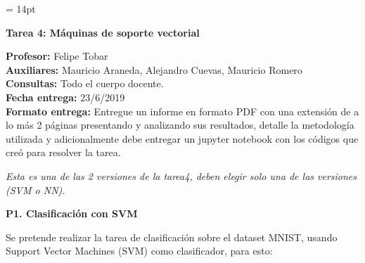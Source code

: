 \documentclass[11pt,letterpaper]{article}
\begin{document}
\pagestyle{fancy}
\fancyhf{}

\headheight = 14pt
\begin{center}
\large {\textbf{Tarea 4: Máquinas de soporte vectorial}}\\
\end{center}
\textbf{Profesor:} Felipe Tobar\\ 
\textbf{Auxiliares:} Mauricio Araneda, Alejandro Cuevas, Mauricio Romero \\
\textbf{Consultas:} Todo el cuerpo docente.\\
\textbf{Fecha entrega:} 23/6/2019 \\
\textbf{Formato entrega:} Entregue un informe en formato PDF con una extensión de a lo más 2 páginas presentando y analizando sus resultados, detalle la metodología utilizada y adicionalmente debe entregar un jupyter notebook con los códigos que creó para resolver la tarea.

\begin{center}
    \textit{Esta es una de las 2 versiones de la tarea4, deben elegir solo una de las versiones (SVM o NN).}
\end{center}


\noindent\textbf{P1. Clasificación con SVM}
\vspace{5mm}

Se pretende realizar la tarea de clasificación sobre el dataset MNIST, usando Support Vector Machines (SVM) como clasificador, para esto:
\end{document}
